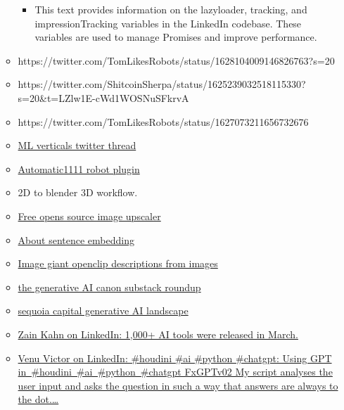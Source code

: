 \begin{itemize}
\begin{itemize}
    \begin{itemize}
     
    \item
      This text provides information on the lazyloader, tracking, and
      impressionTracking variables in the LinkedIn codebase. These
      variables are used to manage Promises and improve performance.
    \end{itemize}
  \item
    https://twitter.com/TomLikesRobots/status/1628104009146826763?s=20
  \item
    https://twitter.com/ShitcoinSherpa/status/1625239032518115330?s=20\&t=LZlw1E-cWd1WOSNuSFkrvA
  \item
    https://twitter.com/TomLikesRobots/status/1627073211656732676
  \item
    \href{https://twitter.com/daniel_eckler/status/1564601398284664832?s=20\&t=79zgNMrzbD89cQto2u5j-Q}{ML
    verticals twitter thread}
  \item
    \href{https://github.com/AUTOMATIC1111/stable-diffusion-webui/wiki/Developing-extensions}{Automatic1111
    robot plugin}
  \item
    2D to blender 3D workflow.
  \item
    \href{https://upscayl.github.io/}{Free opens source image upscaler}
  \item
    \href{https://txt.cohere.ai/sentence-word-embeddings/}{About
    sentence embedding}
  \item
    \href{https://laion.ai/blog/giant-openclip/}{Image giant openclip
    descriptions from images}
  \item
    \href{https://metavert.substack.com/p/the-generative-ai-canon}{the
    generative AI canon substack roundup}
  \item
    \href{https://www.sequoiacap.com/article/generative-ai-a-creative-new-world/}{sequoia
    capital generative AI landscape}
  \item
    \href{https://www.linkedin.com/posts/zainkahn_1000-ai-tools-were-released-in-march-activity-7048285306101358592-4wAA?utm_source=share\&utm_medium=member_android}{Zain
    Kahn on LinkedIn: 1,000+ AI tools were released in March.}
  \item
    \href{https://www.linkedin.com/posts/venu-victor-aa7ab865_houdini-ai-python-activity-7030460619195629568--Sx9?}{Venu
    Victor on LinkedIn: \#houdini \#ai \#python \#chatgpt: Using GPT
    in~\#houdini~\#ai~\#python~\#chatgpt FxGPTv02 My script analyses the
    user input and asks the question in such a way that answers are
    always to the dot.\ldots{}}


\end{itemize}
\end{itemize}
